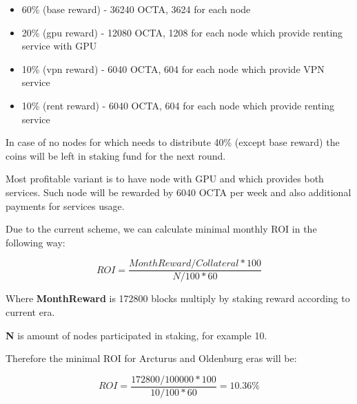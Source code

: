 \begin{itemize}
    \item 60\% (base reward) - 36240 OCTA, 3624 for each node
    \item 20\% (gpu reward) - 12080 OCTA, 1208 for each node which provide renting service with GPU
    \item 10\% (vpn reward) - 6040 OCTA, 604 for each node which provide VPN service
    \item 10\% (rent reward) - 6040 OCTA, 604 for each node which provide renting service
\end{itemize}

In case of no nodes for which needs to distribute 40\% (except base reward) the coins will be left in staking fund for the next round.

Most profitable variant is to have node with GPU and which provides both services.
Such node will be rewarded by 6040 OCTA per week and also additional payments for services usage.

Due to the current scheme, we can calculate minimal monthly ROI in the following way:

\[
    ROI = \frac{MonthReward / Collateral * 100}{ N / 100 * 60}
\]

Where \textbf{MonthReward} is 172800 blocks multiply by staking reward according to current era.

\textbf{N} is amount of nodes participated in staking, for example 10.

Therefore the minimal ROI for Arcturus and Oldenburg eras will be:

\[
    ROI = \frac{172800 / 100000 * 100}{10 / 100 * 60} = 10.36\%
\]
